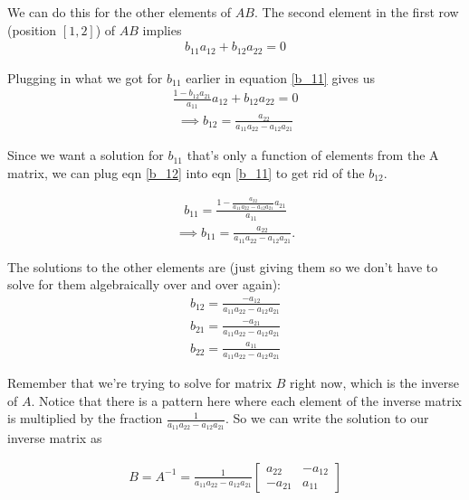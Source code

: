 \documentclass[12pt]{article}
\begin{document}
We can do this for the other elements of $AB$. The second element in the first row (position $[1, 2]$) of $AB$ implies 
\begin{align}
    b_{11}a_{12} + b_{12}a_{22} = 0 
\end{align}

Plugging in what we got for $b_{11}$ earlier in equation \ref{b_11} gives us
\begin{align}
     \frac{1 - b_{12} a_{21}}{a_{11}} a_{12} + b_{12}a_{22} = 0
\end{align}
\begin{align}
     \implies b_{12} = \frac{a_{22}}{a_{11} a_{22} - a_{12} a_{21}}
     \label{b_12}
\end{align}

Since we want a solution for $b_{11}$ that's only a function of elements from the A matrix, we can plug eqn \ref{b_12} into eqn \ref{b_11} to get rid of the $b_{12}$.

\begin{align}
    b_{11} = \frac{1 - \frac{a_{22}}{a_{11} a_{22} - a_{12} a_{21}} a_{21}}{a_{11}} 
\end{align}
\begin{align}
   \implies b_{11} = \frac{a_{22}}{a_{11} a_{22} - a_{12} a_{21}}. 
\end{align}

The solutions to the other elements are (just giving them so we don't have to solve for them algebraically over and over again): 
\begin{align}
    b_{12} = \frac{-a_{12}}{a_{11} a_{22} - a_{12} a_{21}}\\
    b_{21} = \frac{-a_{21}}{a_{11} a_{22} - a_{12} a_{21}} \\
    b_{22} = \frac{a_{11}}{a_{11} a_{22} - a_{12} a_{21}} 
\end{align}

Remember that we're trying to solve for matrix $B$ right now, which is the inverse of $A$. Notice that there is a pattern here where each element of the inverse matrix is multiplied by the fraction $\frac{1}{a_{11} a_{22} - a_{12} a_{21}}$. So we can write the solution to our inverse matrix as 

\begin{align}
    B = A^{-1} = \frac{1}{a_{11} a_{22} - a_{12} a_{21}} \begin{bmatrix}
        a_{22} & -a_{12}\\
        -a_{21} & a_{11}
    \end{bmatrix} \label{2_sol}
\end{align}
\end{document}
